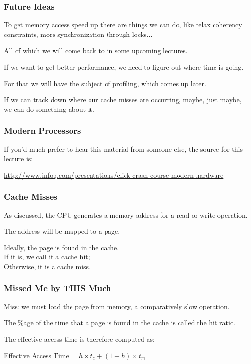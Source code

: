\begin{frame}
\frametitle{Future Ideas}

To get memory access speed up there are things we can do, like relax coherency constraints, more synchronization through locks... 

All of which we will come back to in some upcoming lectures. 

If we want to get better performance, we need to figure out where time is going. 

For that we will have the subject of profiling, which comes up later.

If we can track down where our cache misses are occurring, maybe, just maybe, we can do something about it. 


\end{frame}


\begin{frame}
\frametitle{Modern Processors}

If you'd much prefer to hear this material from someone else, the source for this lecture is:

\begin{center}
\url{http://www.infoq.com/presentations/click-crash-course-modern-hardware}
\end{center}

\end{frame}

\begin{frame}
\frametitle{Cache Misses}

As discussed, the CPU generates a memory address for a read or write operation.

The address will be mapped to a page. 

Ideally, the page is found in the cache.\\
\quad If it is, we call it a \alert{cache hit};\\
\quad Otherwise, it is a \alert{cache miss}.

\end{frame}



\begin{frame}
\frametitle{Missed Me by THIS Much}

Miss: we must load the page from memory, a comparatively slow operation.


The \%age of the time that a page is found in the cache is called the \alert{hit ratio}.

 The effective access time is therefore computed as:

\begin{center}
Effective Access Time = $h \times t_{c} + (1-h) \times t_{m}$
\end{center}

\end{frame}



